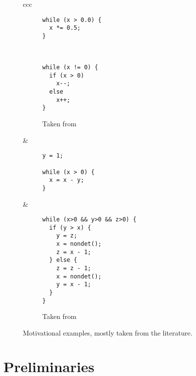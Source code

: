 \documentclass[a4paper]{llncs}
\begin{document}
\begin{figure*}
\begin{tabular}{ccc}
\begin{subfigure}[b]{0.3\textwidth}
\begin{lstlisting}
while (x > 0.0) {
  x *= 0.5;
}
\end{lstlisting}
\caption{}
 \label{fig:motivation.f}
\end{subfigure} \\
\hline

\begin{subfigure}[b]{0.3\textwidth}
\begin{lstlisting}
while (x != 0) {
  if (x > 0)
    x--;
  else
    x++;
}
\end{lstlisting}
\caption{Taken from \cite{DBLP:conf/tacas/CookSZ13}}
 \label{fig:motivation.g}
\end{subfigure} 


&

\begin{subfigure}[b]{0.3\textwidth}
\begin{lstlisting}
y = 1;

while (x > 0) {
  x = x - y;
}
\end{lstlisting}
\caption{}
 \label{fig:motivation.h}
\end{subfigure} 


&


\begin{subfigure}[b]{0.3\textwidth}
\begin{lstlisting}
while (x>0 && y>0 && z>0) {
  if (y > x) {
    y = z;
    x = nondet();
    z = x - 1;
  } else {
    z = z - 1;
    x = nondet();
    y = x - 1;
  }
}
\end{lstlisting}
\caption{Taken from~\cite{BA:mcs}}
 \label{fig:motivation.i}
\end{subfigure} 
% 
% 
% 
% 

\end{tabular}
\caption{Motivational examples, mostly taken from the literature.\label{fig:motivation}}
\end{figure*}




\section{Preliminaries}
\end{document}
